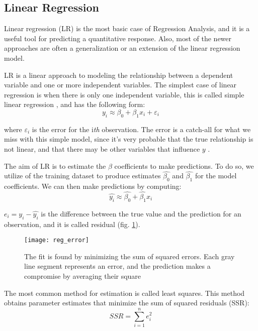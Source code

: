 \subsection{Linear Regression} \label{lin_reg}
Linear regression (LR) is the most basic case of Regression Analysis, and it is a useful tool for predicting a quantitative response. Also, most of the newer approaches are often a generalization or an extension of the linear regression model.

LR is a linear approach to modeling the relationship between a dependent variable and one or more independent variables. The simplest case of linear regression is when there is only one independent variable, this is called simple linear regression \cite{wiki:lin_reg}, and has the following form:
\begin{equation}
	y_i \approx \beta_0 + \beta_1x_i + \varepsilon_i
\end{equation}

where $\varepsilon_i$ is the error for the i\textit{th} observation. The error is a catch-all for what we miss with this simple model, since it's very probable that the true relationship is not linear, and that there may be other variables that influence $y$ \cite{ISLR}.

The aim of LR is to estimate the $\beta$ coefficients to make predictions. To do so, we utilize of the training dataset to produce estimates $\widehat{\beta_0}$ and $\widehat{\beta_1}$ for the model coefficients. We can then make predictions by computing:
\begin{equation}
	\widehat{y_i} \approx \widehat{\beta_0} + {\widehat{\beta_1}x_i}
\end{equation}

$e_i = y_i - \widehat{y_i}$ is the difference between the true value and the prediction for an observation, and it is called residual (fig. \ref{fig:reg_error}).

\begin{figure}[H]
	\centering
	\texttt{[image: reg\_error]}
	\caption{The fit is found by minimizing the sum of squared errors. Each gray line segment represents an error, and the prediction makes a compromise by averaging their square \cite{ISLR}}
	\label{fig:reg_error}
\end{figure}

The most common method for estimation is called least squares. This method obtains parameter estimates that minimize the sum of squared residuals (SSR):
\begin{equation}
	SSR=\sum _{i=1}^{n}e_{i}^{2}
\end{equation}

